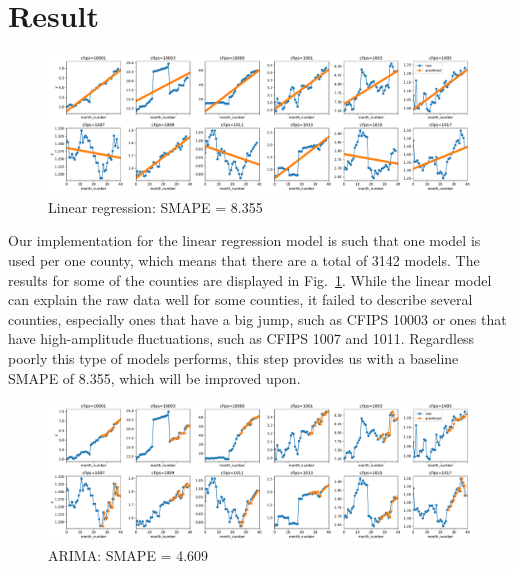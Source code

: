 \documentclass[prl,aps,superscriptaddress,twocolumn,10pt,nolongbibliography]{revtex4-2}
\begin{document}

\section{Result}
\begin{figure}
\includegraphics[width=7in]{figs/linear.pdf}
\caption{\label{fig:linear}
Linear regression: SMAPE = 8.355
}
\end{figure}

Our implementation for the linear regression model is such that one model is used per one county, which means that there are a total of 3142 models. 
The results for some of the counties are displayed in Fig.~\ref{fig:linear}.
While the linear model can explain the raw data well for some counties, it failed to describe several counties, especially ones that have a big jump, such as CFIPS 10003 or ones that have high-amplitude fluctuations, such as CFIPS 1007 and 1011. 
Regardless poorly this type of models performs, this step provides us with a baseline SMAPE of 8.355, which will be improved upon.

\begin{figure}
\includegraphics[width=7in]{figs/arima.pdf}
\caption{\label{fig:arima}
ARIMA: SMAPE = 4.609
}
\end{figure}
\end{document}
